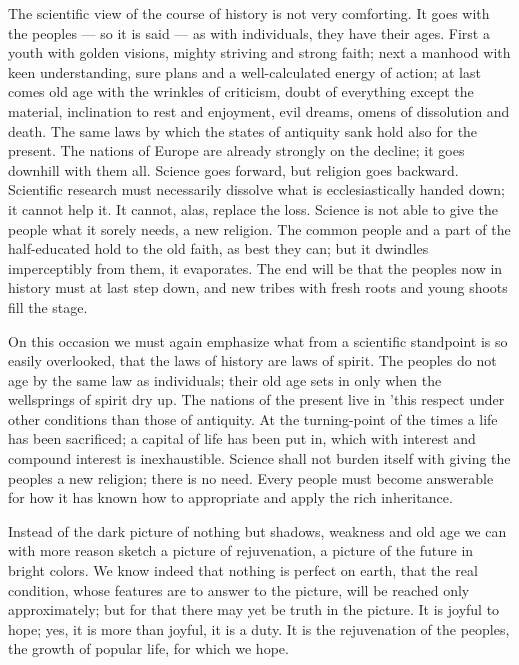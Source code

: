 \documentclass[12pt,a4paper,openany]{book}
\newcommand{\opage}[1]{\marginnote{\footnotesize\textit{[#1]}}}
\begin{document}
The scientific view of the course
of history is not very comforting. It goes with the peoples
--- so it is said --- as with individuals, they have their
ages. First a youth with golden visions, mighty
striving and strong faith; next a manhood
with keen understanding, sure plans and a well-calculated
energy of action; at last comes old age with the wrinkles of criticism,
doubt of everything except the material, inclination
to rest and enjoyment, evil dreams, omens of dissolution
and death. The same laws by which the states of antiquity
sank hold also for the present. The nations of Europe
are already strongly on the decline; it goes
downhill with them all. Science goes forward,
but religion goes backward. Scientific
research must necessarily dissolve what is ecclesiastically handed down;
it cannot help it. It cannot, alas,
replace the loss. Science is not able
to give the people what it sorely needs, a new religion.
The common people and a part of the half-educated hold
to the old faith, as best they can; but it
dwindles imperceptibly from them, it evaporates. The end
will be that the peoples now in history must at last step
down, and new tribes with fresh roots and young shoots
fill the stage.

On this occasion we must again emphasize what
from a scientific standpoint is so easily overlooked,
that the laws of history are laws of spirit. The peoples do not age
by the same law as individuals; their old age
sets in only when the wellsprings of spirit dry up.
The nations of the present live in 'this respect under other
\setcounter{footnote}{0}%
\opage{68}conditions than those of antiquity. At the turning-point of the times
a life has been sacrificed; a capital of life has been put in, which
with interest and compound interest is inexhaustible. Science
shall not burden itself with giving the peoples a
new religion; there is no need. Every people must
become answerable for how it has known how to appropriate
and apply the rich inheritance.

Instead of the dark picture of nothing but shadows,
weakness and old age we can with more reason sketch
a picture of rejuvenation, a picture of the future in
bright colors. We know indeed that nothing is perfect on
earth, that the real condition, whose features are to
answer to the picture, will be reached only approximately; but
for that there may yet be truth in the picture. It is
joyful to hope; yes, it is more than joyful, it
is a duty. It is the rejuvenation of the peoples, the growth of popular life,
for which we hope.
\end{document}
